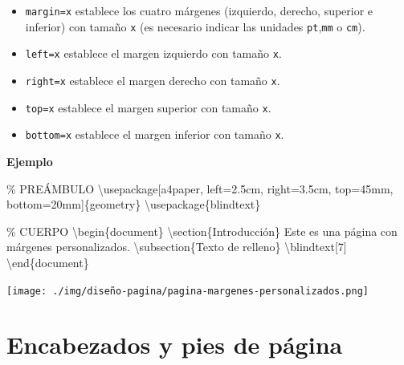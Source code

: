 \documentclass[
  a4paper,
]{scrreport}
\newenvironment{Shaded}{\begin{snugshade}}{\end{snugshade}}
\newcommand{\BuiltInTok}[1]{\textcolor[rgb]{0.00,0.23,0.31}{#1}}
\newcommand{\CommentTok}[1]{\textcolor[rgb]{0.37,0.37,0.37}{#1}}
\newcommand{\ExtensionTok}[1]{\textcolor[rgb]{0.00,0.23,0.31}{#1}}
\newcommand{\FunctionTok}[1]{\textcolor[rgb]{0.28,0.35,0.67}{#1}}
\newcommand{\KeywordTok}[1]{\textcolor[rgb]{0.00,0.23,0.31}{#1}}
\newcommand{\NormalTok}[1]{\textcolor[rgb]{0.00,0.23,0.31}{#1}}
\providecommand{\tightlist}{%
  \setlength{\itemsep}{0pt}\setlength{\parskip}{0pt}}\usepackage{longtable,booktabs,array}
\begin{document}
\begin{itemize}
\tightlist
\item
  \texttt{margin=x} establece los cuatro márgenes (izquierdo, derecho,
  superior e inferior) con tamaño \texttt{x} (es necesario indicar las
  unidades \texttt{pt},\texttt{mm} o \texttt{cm}).
\item
  \texttt{left=x} establece el margen izquierdo con tamaño \texttt{x}.
\item
  \texttt{right=x} establece el margen derecho con tamaño \texttt{x}.
\item
  \texttt{top=x} establece el margen superior con tamaño \texttt{x}.
\item
  \texttt{bottom=x} establece el margen inferior con tamaño \texttt{x}.
\end{itemize}

\textbf{Ejemplo}

\begin{Shaded}
\begin{Highlighting}[]
\CommentTok{\% PREÁMBULO}
\BuiltInTok{\textbackslash{}usepackage}\NormalTok{[a4paper, left=2.5cm, right=3.5cm, top=45mm, bottom=20mm]\{}\ExtensionTok{geometry}\NormalTok{\}}
\BuiltInTok{\textbackslash{}usepackage}\NormalTok{\{}\ExtensionTok{blindtext}\NormalTok{\}}

\CommentTok{\% CUERPO}
\KeywordTok{\textbackslash{}begin}\NormalTok{\{}\ExtensionTok{document}\NormalTok{\}}
\KeywordTok{\textbackslash{}section}\NormalTok{\{Introducción\}}
\NormalTok{Este es una página con márgenes personalizados.}
\KeywordTok{\textbackslash{}subsection}\NormalTok{\{Texto de relleno\}}
\FunctionTok{\textbackslash{}blindtext}\NormalTok{[7]}
\KeywordTok{\textbackslash{}end}\NormalTok{\{}\ExtensionTok{document}\NormalTok{\}}
\end{Highlighting}
\end{Shaded}

\begin{tcolorbox}[enhanced jigsaw, bottomrule=.15mm, leftrule=.75mm, opacityback=0, titlerule=0mm, bottomtitle=1mm, colbacktitle=quarto-callout-note-color!10!white, arc=.35mm, toprule=.15mm, colframe=quarto-callout-note-color-frame, title={Salida}, coltitle=black, colback=white, breakable, toptitle=1mm, rightrule=.15mm, left=2mm, opacitybacktitle=0.6]

\texttt{[image: ./img/diseño-pagina/pagina-margenes-personalizados.png]}

\end{tcolorbox}

\hypertarget{encabezados-y-pies-de-puxe1gina}{%
\section{Encabezados y pies de
página}\label{encabezados-y-pies-de-puxe1gina}}
\end{document}
